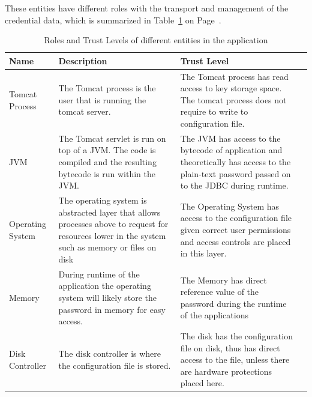 \documentclass[11pt, a4paper, twoside, notitlepage]{article}
\begin{document}
These entities have different roles with the transport and management of the credential data, which is summarized in Table~\ref{trust-level} on Page~\pageref{trust-level}. 

\begin{table}[H]
\begin{tabularx}{\textwidth}{|X|X|X|X|}
\hline
\textbf{Name}    & \textbf{Description}                                                                                                                              & \textbf{Trust Level}                                                                                                                            \\ \hline
Tomcat Process   & The Tomcat process is the user that is running the tomcat server.                                                                                 & The Tomcat process has read access to key storage space. The tomcat process does not require to write to configuration file.                    \\ \hline
JVM              & The Tomcat servlet is run on top of a JVM. The code is compiled and the resulting bytecode is run within the JVM.                                 & The JVM has access to the bytecode of application and theoretically has access to the plain-text password passed on to the JDBC during runtime. \\ \hline
Operating System & The operating system is abstracted layer that allows processes above to request for resources lower in the system such as memory or files on disk & The Operating System has access to the configuration file given correct user permissions and access controls are placed in this layer.          \\ \hline
Memory           & During runtime of the application the operating system will likely store the password in memory for easy access.                                  & The Memory has direct reference value of the password during the runtime of the applications                                                    \\ \hline
Disk Controller  & The disk controller is where the configuration file is stored.                                                                                    & The disk has the configuration file on disk, thus has direct access to the file, unless there are hardware protections placed here.             \\ \hline
\end{tabularx}
\caption{Roles and Trust Levels of different entities in the application}
\label{trust-level}
\end{table}
\end{document}
